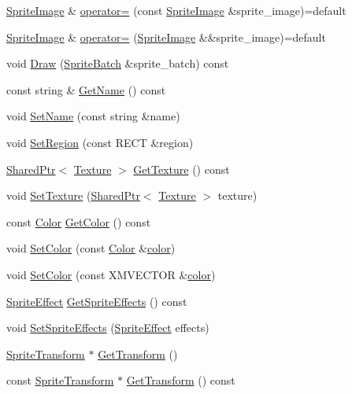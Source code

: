 \begin{DoxyCompactItemize}
\hyperlink{classmage_1_1_sprite_image}{Sprite\+Image} \& \hyperlink{classmage_1_1_sprite_image_a11274f8f6c8653c13ed20d8684ccccd1}{operator=} (const \hyperlink{classmage_1_1_sprite_image}{Sprite\+Image} \&sprite\+\_\+image)=default
\item 
\hyperlink{classmage_1_1_sprite_image}{Sprite\+Image} \& \hyperlink{classmage_1_1_sprite_image_ac30edc4a29f41ad83f341a140335ddde}{operator=} (\hyperlink{classmage_1_1_sprite_image}{Sprite\+Image} \&\&sprite\+\_\+image)=default
\item 
void \hyperlink{classmage_1_1_sprite_image_ae30d3293931f674fea17008063755bb6}{Draw} (\hyperlink{classmage_1_1_sprite_batch}{Sprite\+Batch} \&sprite\+\_\+batch) const
\item 
const string \& \hyperlink{classmage_1_1_sprite_image_a916f6afbb6d48b1feb4dd80740b7ce08}{Get\+Name} () const
\item 
void \hyperlink{classmage_1_1_sprite_image_a86416c5cdc54d90d7ffa08f8b00dc254}{Set\+Name} (const string \&name)
\item 
void \hyperlink{classmage_1_1_sprite_image_a20b1e451e3948a2ce6205ae6119d4531}{Set\+Region} (const R\+E\+CT \&region)
\item 
\hyperlink{namespacemage_a1e01ae66713838a7a67d30e44c67703e}{Shared\+Ptr}$<$ \hyperlink{classmage_1_1_texture}{Texture} $>$ \hyperlink{classmage_1_1_sprite_image_a3c04fb68baaf44e4ee8beb08aff26f35}{Get\+Texture} () const
\item 
void \hyperlink{classmage_1_1_sprite_image_a12e0ffecc7995f13ccf0374fa37dc4c6}{Set\+Texture} (\hyperlink{namespacemage_a1e01ae66713838a7a67d30e44c67703e}{Shared\+Ptr}$<$ \hyperlink{classmage_1_1_texture}{Texture} $>$ texture)
\item 
const \hyperlink{structmage_1_1_color}{Color} \hyperlink{classmage_1_1_sprite_image_a33dff0d92d5b6505da004ea3587dd0ff}{Get\+Color} () const
\item 
void \hyperlink{classmage_1_1_sprite_image_a3f4ef2e0a24c2e9deeb6827bf438ae21}{Set\+Color} (const \hyperlink{structmage_1_1_color}{Color} \&\hyperlink{namespacemage_a56eceea5a9bceb2b56073f3ea4945781}{color})
\item 
void \hyperlink{classmage_1_1_sprite_image_a936547b1852b2249f03c3187bc354ee8}{Set\+Color} (const X\+M\+V\+E\+C\+T\+OR \&\hyperlink{namespacemage_a56eceea5a9bceb2b56073f3ea4945781}{color})
\item 
\hyperlink{namespacemage_a9cfe18123066ba4236f548f9de75d881}{Sprite\+Effect} \hyperlink{classmage_1_1_sprite_image_a3d6d121e19cffd5018fe1da305cba04d}{Get\+Sprite\+Effects} () const
\item 
void \hyperlink{classmage_1_1_sprite_image_a8f3aab311ee05b38daba8a0fa68d30ad}{Set\+Sprite\+Effects} (\hyperlink{namespacemage_a9cfe18123066ba4236f548f9de75d881}{Sprite\+Effect} effects)
\item 
\hyperlink{structmage_1_1_sprite_transform}{Sprite\+Transform} $\ast$ \hyperlink{classmage_1_1_sprite_image_ab39404c038dde5b6ba6c05df35f80b48}{Get\+Transform} ()
\item 
const \hyperlink{structmage_1_1_sprite_transform}{Sprite\+Transform} $\ast$ \hyperlink{classmage_1_1_sprite_image_a3f49b42a7902421115601c2e5d73e795}{Get\+Transform} () const
\end{DoxyCompactItemize}
